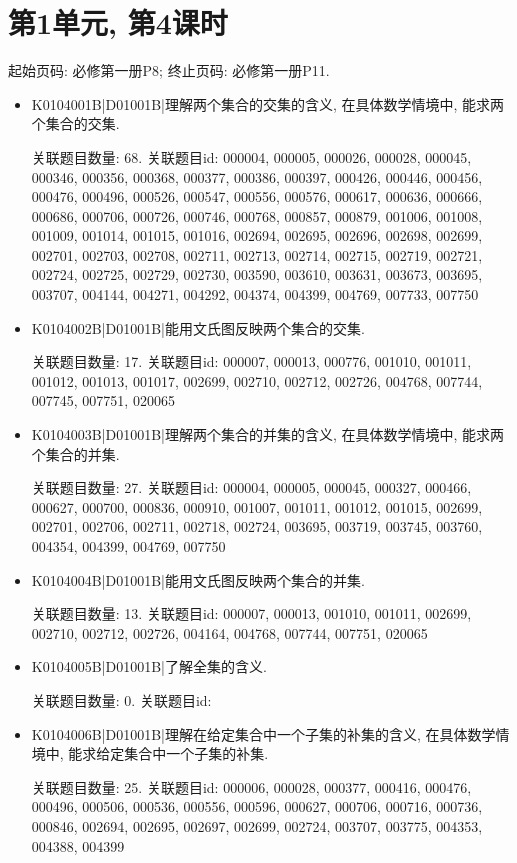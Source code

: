 \section*{第1单元, 第4课时}
起始页码: 必修第一册P8; 终止页码: 必修第一册P11.
\begin{itemize}
\item K0104001B|D01001B|理解两个集合的交集的含义, 在具体数学情境中, 能求两个集合的交集.

关联题目数量: 68. 关联题目id: 000004, 000005, 000026, 000028, 000045, 000346, 000356, 000368, 000377, 000386, 000397, 000426, 000446, 000456, 000476, 000496, 000526, 000547, 000556, 000576, 000617, 000636, 000666, 000686, 000706, 000726, 000746, 000768, 000857, 000879, 001006, 001008, 001009, 001014, 001015, 001016, 002694, 002695, 002696, 002698, 002699, 002701, 002703, 002708, 002711, 002713, 002714, 002715, 002719, 002721, 002724, 002725, 002729, 002730, 003590, 003610, 003631, 003673, 003695, 003707, 004144, 004271, 004292, 004374, 004399, 004769, 007733, 007750

\item K0104002B|D01001B|能用文氏图反映两个集合的交集.

关联题目数量: 17. 关联题目id: 000007, 000013, 000776, 001010, 001011, 001012, 001013, 001017, 002699, 002710, 002712, 002726, 004768, 007744, 007745, 007751, 020065

\item K0104003B|D01001B|理解两个集合的并集的含义, 在具体数学情境中, 能求两个集合的并集.

关联题目数量: 27. 关联题目id: 000004, 000005, 000045, 000327, 000466, 000627, 000700, 000836, 000910, 001007, 001011, 001012, 001015, 002699, 002701, 002706, 002711, 002718, 002724, 003695, 003719, 003745, 003760, 004354, 004399, 004769, 007750

\item K0104004B|D01001B|能用文氏图反映两个集合的并集.

关联题目数量: 13. 关联题目id: 000007, 000013, 001010, 001011, 002699, 002710, 002712, 002726, 004164, 004768, 007744, 007751, 020065

\item K0104005B|D01001B|了解全集的含义.

关联题目数量: 0. 关联题目id: 

\item K0104006B|D01001B|理解在给定集合中一个子集的补集的含义, 在具体数学情境中, 能求给定集合中一个子集的补集.

关联题目数量: 25. 关联题目id: 000006, 000028, 000377, 000416, 000476, 000496, 000506, 000536, 000556, 000596, 000627, 000706, 000716, 000736, 000846, 002694, 002695, 002697, 002699, 002724, 003707, 003775, 004353, 004388, 004399


\end{itemize}
